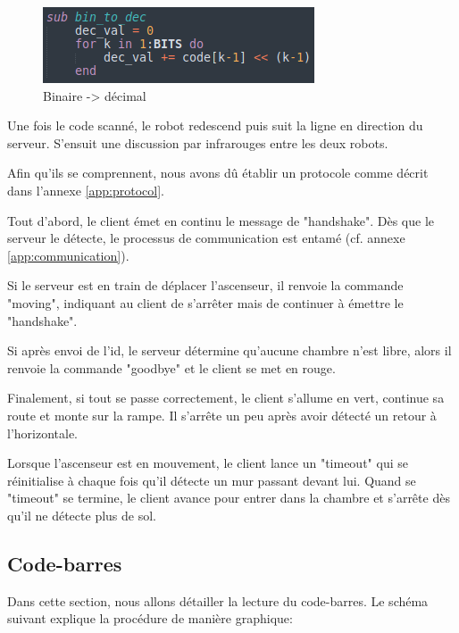 \begin{figure}[H]
  \centering
  \includegraphics[width=0.8\linewidth]{code/client_bin_to_dec}
  \caption{Binaire -> décimal}
  \label{fig:client_bin_to_dec}
\end{figure}

Une fois le code scanné, le robot redescend puis suit la ligne en direction du serveur.
S'ensuit une discussion par infrarouges entre les deux robots.

Afin qu'ils se comprennent, nous avons dû établir un protocole comme décrit dans l'annexe \ref{app:protocol}.

Tout d'abord, le client émet en continu le message de "handshake". Dès que le serveur le détecte, le processus de communication est entamé (cf. annexe \ref{app:communication}).

Si le serveur est en train de déplacer l'ascenseur, il renvoie la commande "moving", indiquant au client de s'arrêter mais de continuer à émettre le "handshake".

Si après envoi de l'id, le serveur détermine qu'aucune chambre n'est libre, alors il renvoie la commande "goodbye" et le client se met en rouge.

Finalement, si tout se passe correctement, le client s'allume en vert, continue sa route et monte sur la rampe. Il s'arrête un peu après avoir détecté un retour à l'horizontale.

Lorsque l'ascenseur est en mouvement, le client lance un "timeout" qui se réinitialise à chaque fois qu'il détecte un mur passant devant lui. Quand se "timeout" se termine, le client avance pour entrer dans la chambre et s'arrête dès qu'il ne détecte plus de sol.

\subsection{Code-barres}
\label{sec:barcode}

Dans cette section, nous allons détailler la lecture du code-barres. Le schéma suivant explique la procédure de manière graphique:

